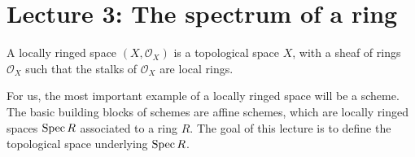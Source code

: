 \section*{Lecture 3: The spectrum of a ring}

\renewcommand\qedsymbol{$\mathbb{QED}$}

\begin{definition}
    A locally ringed space $(X, \mathcal{O}_X)$ is a topological space $X$, with a sheaf of rings $\mathcal{O}_X$ such that the stalks of $\mathcal{O}_X$ are local rings.
  \end{definition}

  For us, the most important example of a locally ringed space will be a scheme.
  The basic building blocks of schemes are affine schemes, which are locally ringed spaces \(\operatorname{Spec} R\) associated to a ring \(R\).
  The goal of this lecture is to define the topological space underlying \(\operatorname{Spec} R\).
  
